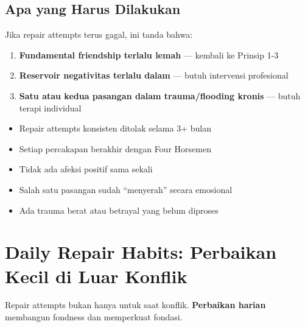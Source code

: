 \subsection{Apa yang Harus Dilakukan}

\begin{insightbox}
Jika repair attempts terus gagal, ini tanda bahwa:
\begin{enumerate}
    \item \textbf{Fundamental friendship terlalu lemah} --- kembali ke Prinsip 1-3
    \item \textbf{Reservoir negativitas terlalu dalam} --- butuh intervensi profesional
    \item \textbf{Satu atau kedua pasangan dalam trauma/flooding kronis} --- butuh terapi individual
\end{enumerate}
\end{insightbox}

\begin{warningbox}
\begin{itemize}
    \item Repair attempts konsisten ditolak selama 3+ bulan
    \item Setiap percakapan berakhir dengan Four Horsemen
    \item Tidak ada afeksi positif sama sekali
    \item Salah satu pasangan sudah ``menyerah'' secara emosional
    \item Ada trauma berat atau betrayal yang belum diproses
\end{itemize}
\end{warningbox}

\section{Daily Repair Habits: Perbaikan Kecil di Luar Konflik}

Repair attempts bukan hanya untuk saat konflik. \textbf{Perbaikan harian} membangun fondness dan memperkuat fondasi.

